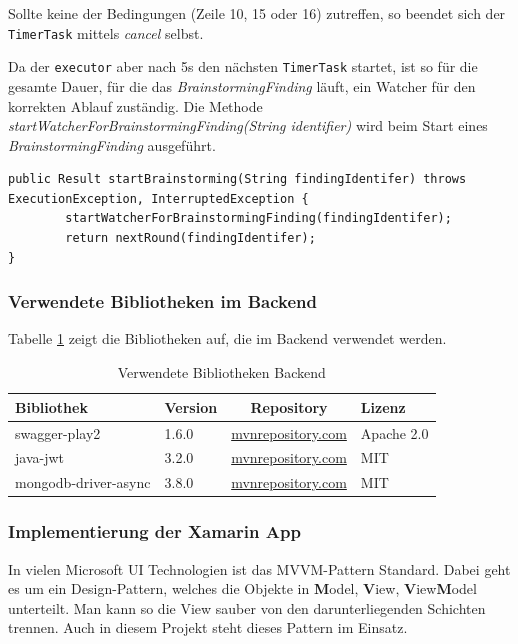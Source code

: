 Sollte keine der Bedingungen (Zeile 10, 15 oder 16) zutreffen, so beendet sich der \texttt{TimerTask} mittels \textit{cancel} selbst. 

Da der \texttt{executor} aber nach 5s den nächsten \texttt{TimerTask} startet, ist so für die gesamte Dauer, für die das \textit{BrainstormingFinding} läuft, ein \grqq Watcher\grqq{} für den korrekten Ablauf zuständig. Die Methode \textit{startWatcherForBrainstormingFinding(String identifier)} wird beim Start eines \textit{BrainstormingFinding} ausgeführt.

\begin{lstlisting}
public Result startBrainstorming(String findingIdentifer) throws ExecutionException, InterruptedException {
        startWatcherForBrainstormingFinding(findingIdentifer);
        return nextRound(findingIdentifer);
}
\end{lstlisting}

\subsubsection{Verwendete Bibliotheken im Backend}
Tabelle \ref{tab:verwendete-libraries-play} zeigt die Bibliotheken auf, die im Backend verwendet werden. 
\begin{table}[h]
	\centering
	\begin{tabular}{| l | l | c | l |}
		\hline
		\textbf{Bibliothek} & \textbf{Version} & \textbf{Repository} & \textbf{Lizenz}\\
		\hline
		swagger-play2 & 1.6.0 & \href{https://mvnrepository.com/artifact/io.swagger/swagger-play2_2.12/1.6.0}{mvnrepository.com} & Apache 2.0 \\
		java-jwt & 3.2.0 & \href{https://mvnrepository.com/artifact/com.auth0/java-jwt/3.2.0}{mvnrepository.com} & MIT \\
		mongodb-driver-async & 3.8.0 & \href{https://mvnrepository.com/artifact/org.mongodb/mongodb-driver-async/3.8.0}{mvnrepository.com} & MIT \\
		\hline
	\end{tabular}
	\caption[Story-Points]{Verwendete Bibliotheken Backend}
	\label{tab:verwendete-libraries-play}
\end{table}

\subsubsection{Implementierung der Xamarin App}
In vielen Microsoft UI Technologien ist das MVVM-Pattern Standard. Dabei geht es um ein Design-Pattern, welches die Objekte in \textbf{M}odel, \textbf{V}iew, \textbf{V}iew\textbf{M}odel unterteilt. Man kann so die View sauber von den darunterliegenden Schichten trennen. Auch in diesem Projekt steht dieses Pattern im Einsatz.


